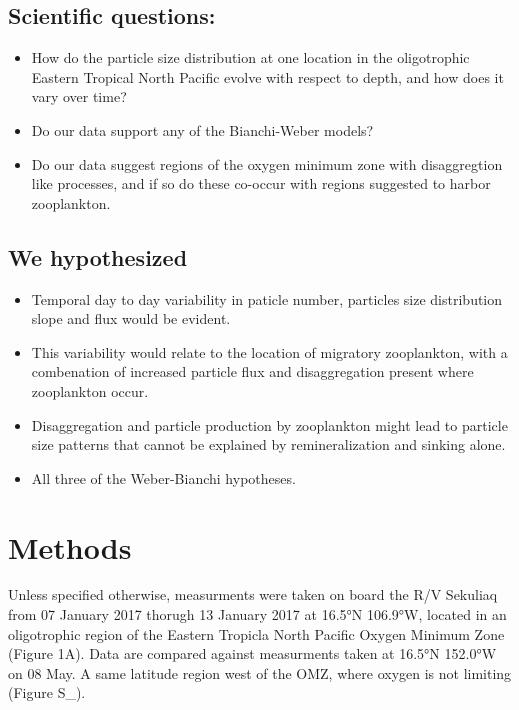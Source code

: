 \documentclass[]{article}
\providecommand{\tightlist}{%
  \setlength{\itemsep}{0pt}\setlength{\parskip}{0pt}}
\begin{document}
\hypertarget{scientific-questions}{%
\subsection{Scientific questions:}\label{scientific-questions}}

\begin{itemize}
\tightlist
\item
  How do the particle size distribution at one location in the
  oligotrophic Eastern Tropical North Pacific evolve with respect to
  depth, and how does it vary over time?
\item
  Do our data support any of the Bianchi-Weber models?
\item
  Do our data suggest regions of the oxygen minimum zone with
  disaggregtion like processes, and if so do these co-occur with regions
  suggested to harbor zooplankton.
\end{itemize}

\hypertarget{we-hypothesized}{%
\subsection{We hypothesized}\label{we-hypothesized}}

\begin{itemize}
\tightlist
\item
  Temporal day to day variability in paticle number, particles size
  distribution slope and flux would be evident.
\item
  This variability would relate to the location of migratory
  zooplankton, with a combenation of increased particle flux and
  disaggregation present where zooplankton occur.
\item
  Disaggregation and particle production by zooplankton might lead to
  particle size patterns that cannot be explained by remineralization
  and sinking alone.
\item
  All three of the Weber-Bianchi hypotheses.
\end{itemize}

\hypertarget{methods}{%
\section{Methods}\label{methods}}

Unless specified otherwise, measurments were taken on board the R/V
Sekuliaq from 07 January 2017 thorugh 13 January 2017 at 16.5°N 106.9°W,
located in an oligotrophic region of the Eastern Tropicla North Pacific
Oxygen Minimum Zone (Figure 1A). Data are compared against measurments
taken at 16.5°N 152.0°W on 08 May. A same latitude region west of the
OMZ, where oxygen is not limiting (Figure S\_).
\end{document}
